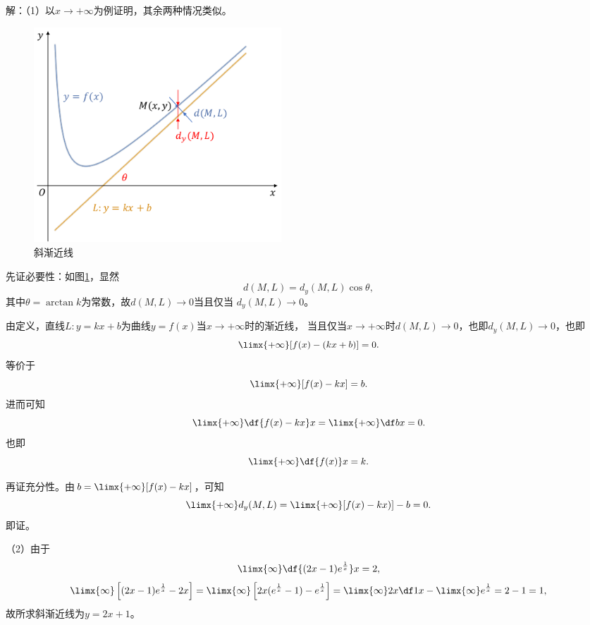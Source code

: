 解：（1）以$x\to+\infty$为例证明，其余两种情况类似。

\begin{figure}[h]
	\centering
	\includegraphics[width=0.45\textwidth]{./images/ch01/fkxb.pdf}
	\caption{斜渐近线}
	\label{fig:fkxb}
\end{figure}

先证必要性：如图\ref{fig:fkxb}，显然
$$d(M,L)=d_y(M,L)\cos\theta,$$
其中$\theta=\arctan k$为常数，故$d(M,L)\to 0$当且仅当
$d_y(M,L)\to 0$。

由定义，直线$L:y=kx+b$为曲线$y=f(x)$当$x\to+\infty$时的渐近线，
当且仅当$x\to+\infty$时$d(M,L)\to 0$，也即$d_y(M,L)\to 0$，也即
$$\limx{+\infty}[f(x)-(kx+b)]=0.$$
等价于
$$\limx{+\infty}[f(x)-kx]=b.$$
进而可知
$$\limx{+\infty}\df{f(x)-kx}x=\limx{+\infty}\df bx=0.$$
也即
$$\limx{+\infty}\df{f(x)}x=k.$$

再证充分性。由$b=\limx{+\infty}[f(x)-kx]$，可知
$$\limx{+\infty}d_y(M,L)=\limx{+\infty}[f(x)-kx)]-b=0.$$
即证。

（2）由于
$$\limx{\infty}\df{(2x-1)e^{\frac1x}}x=2,$$
$$\limx{\infty}\left[(2x-1)e^{\frac1x}-2x\right]
=\limx{\infty}\left[2x(e^{\frac1x}-1)-e^{\frac1x}\right]
=\limx{\infty}2x\df1x-\limx{\infty}e^{\frac1x}=2-1=1,$$
故所求斜渐近线为$y=2x+1$。
\fin

